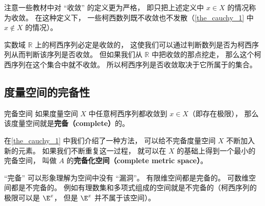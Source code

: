 注意一些教材中对 “收敛” 的定义更为严格， 即只把上述定义中 $x \in X$ 的情况称为收敛。 在这种定义下， 一些柯西数列既不收敛也不发散（\autoref{the_cauchy_1} 中 $x\notin X$ 的情况）。



实数域 $\mathbb R$ 上的柯西序列必定是收敛的， 这使我们可以通过判断数列是否为柯西序列从而判断该序列是否收敛。 但如果我们从 $\mathbb R$ 中把收敛的那点挖走， 那么这个柯西序列在这个集合中就不收敛。 所以柯西序列是否收敛取决于它所属于的集合。 %

\subsection{度量空间的完备性}

\begin{definition}{完备空间}\label{def_cauchy_2}
如果度量空间 $X$ 中任意柯西序列都收敛到 $x\in X$（即存在极限）， 那么该度量空间就是\textbf{完备（complete）}的。
\end{definition}

在\autoref{the_cauchy_1} 中我们介绍了一种方法， 可以给不完备度量空间 $X$ 不断加入新的元素。 如果我们不断重复这一过程， 就可以在 $X$ 的基础上得到一个最小的完备空间， 叫做 $A$ 的\textbf{完备化空间（complete metric space）}。


“完备” 可以形象理解为空间中没有 “漏洞”。 有限维空间都是完备的。 可数维空间都是不完备的。 例如有理数集和多项式组成的空间就是不完备的（柯西序列的极限可以是 $\E^x$， 但是 $\E^x$ 并不属于该空间）。
